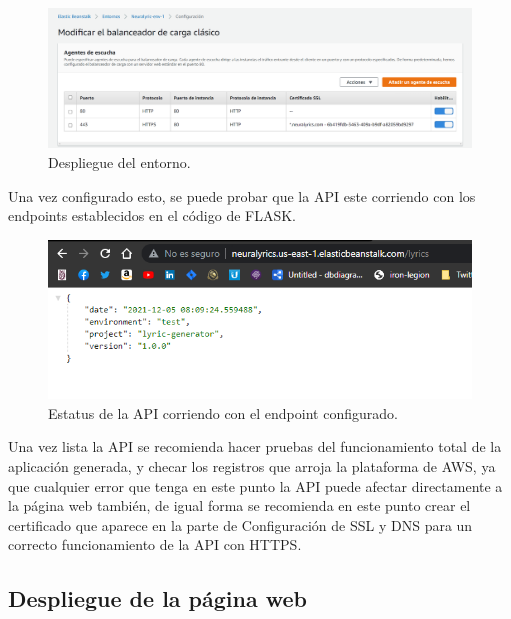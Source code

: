 \documentclass[12pt, a4paper, titlepage]{report}
\begin{document}
\begin{figure}[H]
	\includegraphics[width=12cm]{./imagenes/Desarrollo/BackEnd/config_balanceador.png}
	\centering 
	\caption{Despliegue del entorno.}
\end{figure}
Una vez configurado esto, se puede probar que la API este corriendo con los endpoints establecidos en el código de FLASK.
\begin{figure}[H]
	\includegraphics[width=12cm]{./imagenes/Desarrollo/BackEnd/api_corriendo.png}
	\centering 
	\caption{Estatus de la API corriendo con el endpoint configurado.}
\end{figure}
Una vez lista la API se recomienda hacer pruebas del funcionamiento total de la aplicación generada, y checar los registros que arroja la plataforma de AWS, ya que cualquier error que tenga en este punto la API puede afectar directamente a la página web también, de igual forma se recomienda en este punto crear el certificado que aparece en la parte de Configuración de SSL y DNS para un correcto funcionamiento de la API con HTTPS.
\newpage


\subsection{Despliegue de la página web}
\end{document}
